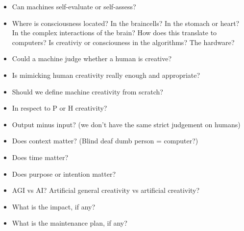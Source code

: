 \begin{itemize}
  \item Can machines self-evaluate or self-assess?
  \item Where is consciousness located? In the braincells? In the stomach or heart? In the complex interactions of the brain? How does this translate to computers? Is creativiy or consciouness in the algorithms? The hardware?
  \item Could a machine judge whether a human is creative?
  \item Is mimicking human creativity really enough and appropriate?
  \item Should we define machine creativity from scratch?
  \item In respect to P or H creativity?
  \item Output minus input? (we don’t have the same strict judgement on humans)
  \item Does context matter? (Blind deaf dumb person = computer?)
  \item Does time matter?
  \item Does purpose or intention matter?
  \item AGI vs AI? Artificial general creativity vs artificial creativity?
  \item What is the impact, if any?
  \item What is the maintenance plan, if any?
\end{itemize}

